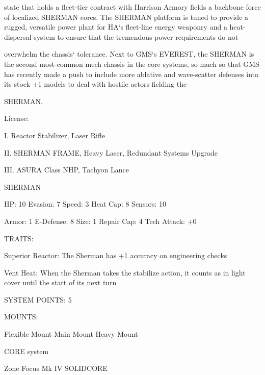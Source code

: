 state that holds a fleet-tier contract with Harrison Armory fields a backbone force of localized SHERMAN  
cores. The SHERMAN platform is tuned to provide a rugged, versatile power plant for HA‘s fleet-line  
energy weaponry and a heat-dispersal system to ensure that the tremendous power requirements do not  

overwhelm the chassis‘ tolerance. Next to GMS‘s EVEREST, the SHERMAN is the second most-common  
mech chassis in the core systems, so much so that GMS has recently made a push to include more  
ablative and wave-scatter defenses into its stock +1 models to deal with hostile actors fielding the  

SHERMAN.   

                                                  License:
 
I. Reactor Stabilizer, Laser Rifle
 
II. SHERMAN FRAME, Heavy Laser, Redundant Systems Upgrade
 
III. ASURA Class NHP, Tachyon Lance
 

                                                SHERMAN 

 HP: 10         Evasion: 7                            Speed: 3           Heat Cap: 8       Sensors: 10 

 Armor: 1       E-Defense: 8                          Size: 1            Repair Cap: 4     Tech Attack:  
                                                                                           +0 

                                                  TRAITS: 

 Superior Reactor: The Sherman has +1 accuracy on engineering checks
 
 Vent Heat: When the Sherman takes the stabilize action, it counts as in light cover until the start of its  
 next turn 

                                            SYSTEM POINTS: 5 

                                                 MOUNTS: 

 Flexible Mount                    Main Mount                            Heavy Mount 

                                               CORE system 

                                                                                                           


                                       Zone Focus Mk IV  SOLIDCORE  


